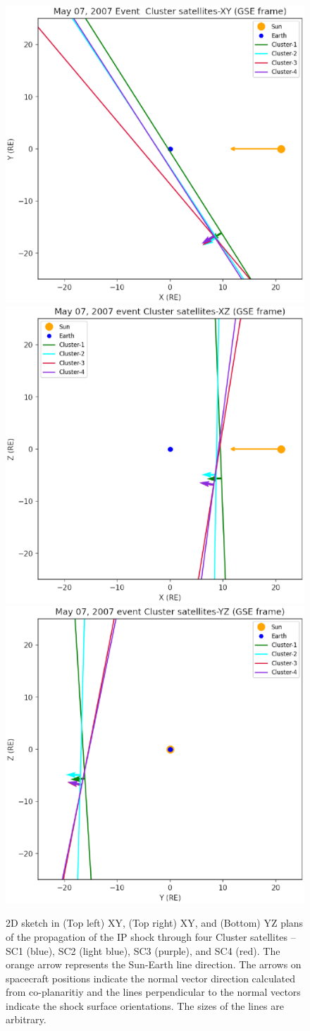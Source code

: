 \documentclass[draft]{agujournal2019}
\begin{document}
\begin{figure}
\includegraphics[width=.35\linewidth]{jgr-2023-ipshocks-f16a.eps}
\includegraphics[width=.35\linewidth]{jgr-2023-ipshocks-f16b.eps}
\includegraphics[width=.35\linewidth]{jgr-2023-ipshocks-f16c.eps}
\caption{2D sketch in (Top left) XY, (Top right) XY, and (Bottom) YZ plans of the propagation of the IP shock through four Cluster satellites – SC1 (blue), SC2 (light blue), SC3 (purple), and SC4 (red). The orange arrow represents the Sun-Earth line direction. The arrows on spacecraft positions indicate the normal vector direction calculated from co-planaritiy and the lines perpendicular to the normal vectors indicate the shock surface orientations. The sizes of the lines are arbitrary.\label{fig:clustertogether}}
\end{figure}

\pagebreak

\end{document}
